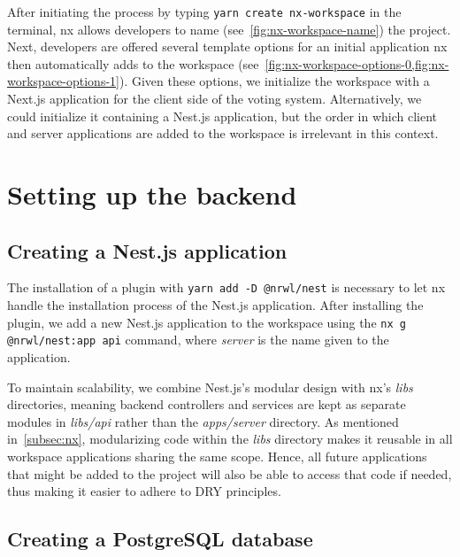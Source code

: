 After initiating the process by typing \texttt{yarn create nx-workspace} in the terminal, nx allows developers to name (see~\cref{fig:nx-workspace-name}) the project.
Next, developers are offered several template options for an initial application nx then automatically adds to the workspace (see~\cref{fig:nx-workspace-options-0,fig:nx-workspace-options-1}).
Given these options, we initialize the workspace with a Next.js application for the client side of the voting system.
Alternatively, we could initialize it containing a Nest.js application, but the order in which client and server applications are added to the workspace is irrelevant in this context.

\section{Setting up the backend}\label{sec:setting-up-a-nest.js-backend}

\subsection{Creating a Nest.js application}\label{subsec:creating-a-nest.js-application}

The installation of a plugin with \texttt{yarn add -D @nrwl/nest} is necessary to let nx handle the installation process of the Nest.js application.
After installing the plugin, we add a new Nest.js application to the workspace using the \texttt{nx g @nrwl/nest:app api} command, where \emph{server} is the name given to the application.

To maintain scalability, we combine Nest.js's modular design with nx's \emph{libs} directories, meaning backend controllers and services are kept as separate modules in \emph{libs/api} rather than the \emph{apps/server} directory.
As mentioned in~\cref{subsec:nx}, modularizing code within the \emph{libs} directory makes it reusable in all workspace applications sharing the same scope.
Hence, all future applications that might be added to the project will also be able to access that code if needed, thus making it easier to adhere to \gls{DRY} principles.

\subsection{Creating a PostgreSQL database}\label{subsec:creating-a-postgresql-database}

